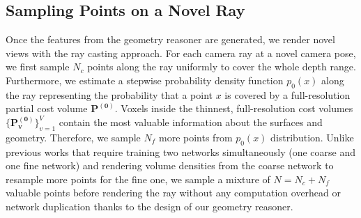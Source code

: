 \subsection{Sampling Points on a Novel Ray} \label{sec:c3_sampling}

Once the features from the geometry reasoner are generated, we render novel views with the ray casting approach. For each camera ray at a novel camera pose, we first sample $N_{c}$ points along the ray uniformly to cover the whole depth range. Furthermore, we estimate a stepwise probability density function $p_{0}(x)$ along the ray representing the probability that a point $x$ is covered by a full-resolution partial cost volume $\boldsymbol{P^{(0)}}$. Voxels inside the thinnest, full-resolution cost volumes $\{\boldsymbol{P_{v}^{(0)}}\}_{v=1}^{V}$ contain the most valuable information about the surfaces and geometry. Therefore, we sample $N_{f}$ more points from $p_{0}(x)$ distribution. Unlike previous works\cite{mildenhall2020nerf,yu2021pixelnerf, wang2021ibrnet, reizenstein2021common, arandjelovic2021nerf} that require training two networks simultaneously (one coarse and one fine network) and rendering volume densities from the coarse network to resample more points for the fine one, we sample a mixture of $N=N_{c} + N_{f}$ valuable points before rendering the ray without any computation overhead or network duplication thanks to the design of our geometry reasoner.

